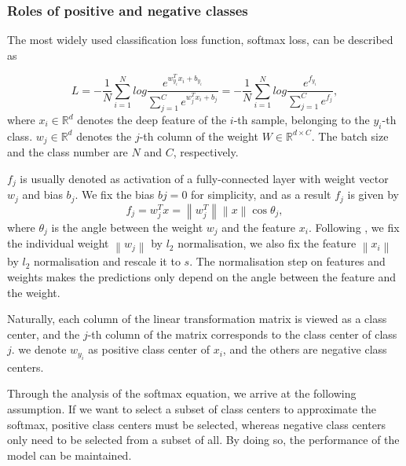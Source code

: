 \documentclass[letterpaper]{article} \usepackage{style/aaai21}  \usepackage{times}  \usepackage{helvet} \usepackage{courier}  \usepackage[hyphens]{url}  \usepackage{graphicx} \usepackage{color}
\begin{document}
\subsubsection{Roles of positive and negative classes}
The most widely used classification loss function, softmax loss, can be described as 

\begin{equation}
L = - \frac{1}{N}{\sum\limits_{i=1}^{N}log\frac{e^{w_{y_i}^Tx_i  + b_{y_i}}}{\sum\nolimits_{j=1}^{C}e^{w_{j}^Tx_i  + b_j}}} = - \frac{1}{N}{\sum\limits_{i=1}^{N}log\frac{e^{f_{y_i}}}{\sum\nolimits_{j=1}^{C}e^{f_j}}}, 
\end{equation}
where $x_i \in \mathbb{R}^{d}$ denotes the deep feature of the $i$-th sample, belonging to the $y_i$-th class. $w_j \in \mathbb{R}^{d}$ denotes the $j$-th column of the weight $W \in \mathbb{R}^{d\times C}$. The batch size and the class number are $N$ and $C$, respectively.

$f_j $ is usually denoted as activation of a fully-connected layer with weight vector $w_j$ and bias $b_j$. We fix the bias $bj=0$ for simplicity, and as a result  $f_j$ is given by 
\begin{equation}
f_j = w_{j}^T x = \left \|w_{j}^T\right \| \left \|x\right \|\cos\theta_j, 
\end{equation} 
where $\theta_j$ is the angle between the weight $w_j$ and the feature $x_i$. Following \cite{wang2018cosface,liu2017sphereface,deng2019arcface,wang2018additive}, we
fix the individual weight $\left\|w_{j}\right\|$ by $l_2$ normalisation, we also fix the feature $\left\|x_{i}\right\|$ by $l_2$ normalisation
and rescale it to $s$.  The normalisation step on features and weights makes the predictions only depend on the angle between the feature and the weight.

Naturally, each column of the linear transformation matrix is viewed as a class center, and the $j$-th column of the matrix corresponds to the class center of class $j$. we denote $w_{y_i}$ as positive class center of $x_i$, and the others are negative class centers. 

Through the analysis of the softmax equation, we arrive at the following assumption. If we want to select a subset of class centers to approximate the softmax, positive class centers must be selected, whereas negative class centers only need to be selected from a subset of all. By doing so, the performance of the model can be maintained.
\end{document}
